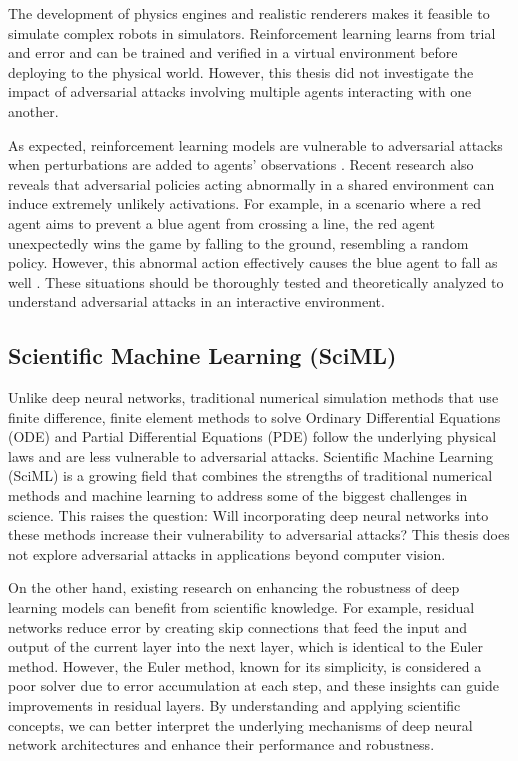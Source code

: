 The development of physics engines and realistic renderers makes it feasible to simulate complex robots in simulators. Reinforcement learning learns from trial and error and can be trained and verified in a virtual environment before deploying to the physical world. However, this thesis did not investigate the impact of adversarial attacks involving multiple agents interacting with one another.

As expected, reinforcement learning models are vulnerable to adversarial attacks when perturbations are added to agents' observations \citep{chen2019adversarial}. Recent research also reveals that adversarial policies acting abnormally in a shared environment can induce extremely unlikely activations. For example, in a scenario where a red agent aims to prevent a blue agent from crossing a line, the red agent unexpectedly wins the game by falling to the ground, resembling a random policy. However, this abnormal action effectively causes the blue agent to fall as well \citep{gleave2021adversarial}. These situations should be thoroughly tested and theoretically analyzed to understand adversarial attacks in an interactive environment.

\subsection{Scientific Machine Learning (SciML)}

Unlike deep neural networks, traditional numerical simulation methods that use finite difference, finite element methods to solve Ordinary Differential Equations (ODE) and Partial Differential Equations (PDE) follow the underlying physical laws and are less vulnerable to adversarial attacks. Scientific Machine Learning (SciML) is a growing field that combines the strengths of traditional numerical methods and machine learning to address some of the biggest challenges in science. This raises the question: Will incorporating deep neural networks into these methods increase their vulnerability to adversarial attacks? This thesis does not explore adversarial attacks in applications beyond computer vision.

On the other hand, existing research on enhancing the robustness of deep learning models can benefit from scientific knowledge. For example, residual networks reduce error by creating skip connections that feed the input and output of the current layer into the next layer, which is identical to the Euler method. However, the Euler method, known for its simplicity, is considered a poor solver due to error accumulation at each step, and these insights can guide improvements in residual layers. By understanding and applying scientific concepts, we can better interpret the underlying mechanisms of deep neural network architectures and enhance their performance and robustness.
